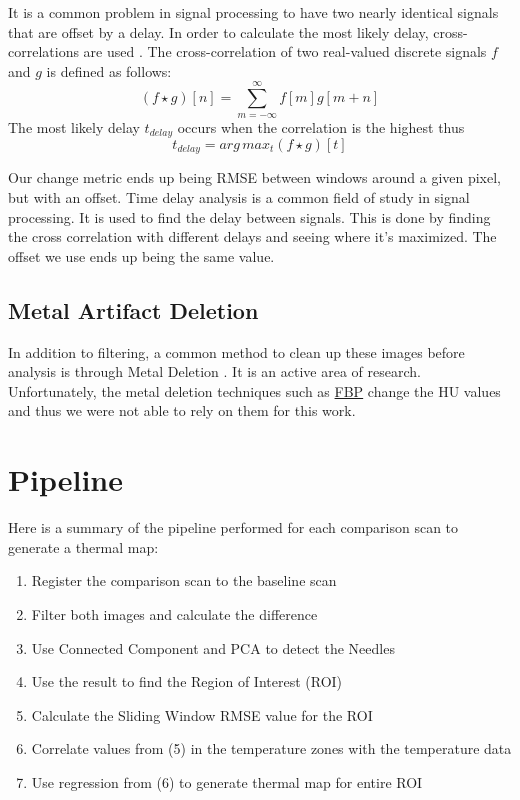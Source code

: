\documentclass[]{spie}  %
\begin{document}
It is a common problem in signal processing to have two nearly identical signals that are offset by a delay. In order to calculate the most likely delay, cross-correlations are used \cite{Rhudy09}. The cross-correlation of two real-valued discrete signals $f$ and $g$ is defined as follows:
\[
(f \star g)[n] = \sum_{m=-\infty}^{\infty}{f[m]g[m+n]}
\]
The most likely delay $t_{delay}$ occurs when the correlation is the highest thus
\[
t_{delay} = arg\,max_t (f \star g)[t]
\]

Our change metric ends up being RMSE between windows around a given pixel, but with an offset. Time delay analysis is a common field of study in signal processing. It is used to find the delay between signals. This is done by finding the cross correlation with different delays and seeing where it's maximized. The offset we use ends up being the same value. 

\subsection{Metal Artifact Deletion}

In addition to filtering, a common method to clean up these images before analysis is through Metal Deletion \cite{Boas11}. It is an active area of research. Unfortunately, the metal deletion techniques such as \href{http://www.mathworks.com/matlabcentral/fileexchange/34608-ct-reconstruction-package}{FBP} \cite{Bangert12} change the HU values and thus we were not able to rely on them for this work. 


\section{Pipeline}

Here is a summary of the pipeline performed for each comparison scan to generate a thermal map:
\begin{enumerate}
\item Register the comparison scan to the baseline scan
\item Filter both images and calculate the difference
\item Use Connected Component and PCA to detect the Needles
\item Use the result to find the Region of Interest (ROI)
\item Calculate the Sliding Window RMSE value for the ROI
\item Correlate values from (5) in the temperature zones with the temperature data
\item Use regression from (6) to generate thermal map for entire ROI
\end{enumerate}
\end{document}
